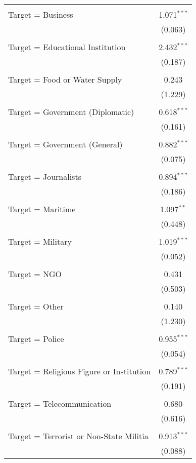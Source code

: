 \begin{table}[!htbp]
\begin{tabular}{@{\extracolsep{0.1pt}}lc}
  & \\ 
 Target = Business & 1.071$^{***}$ \\ 
  & (0.063) \\ 
  & \\ 
 Target = Educational Institution & 2.432$^{***}$ \\ 
  & (0.187) \\ 
  & \\ 
 Target = Food or Water Supply & 0.243 \\ 
  & (1.229) \\ 
  & \\ 
 Target = Government (Diplomatic) & 0.618$^{***}$ \\ 
  & (0.161) \\ 
  & \\ 
 Target =  Government (General) & 0.882$^{***}$ \\ 
  & (0.075) \\ 
  & \\ 
 Target = Journalists & 0.894$^{***}$ \\ 
  & (0.186) \\ 
  & \\ 
 Target = Maritime & 1.097$^{**}$ \\ 
  & (0.448) \\ 
  & \\ 
 Target = Military & 1.019$^{***}$ \\ 
  & (0.052) \\ 
  & \\ 
 Target = NGO & 0.431 \\ 
  & (0.503) \\ 
  & \\ 
 Target = Other & 0.140 \\ 
  & (1.230) \\ 
  & \\ 
 Target = Police & 0.955$^{***}$ \\ 
  & (0.054) \\ 
  & \\ 
 Target = Religious Figure or Institution & 0.789$^{***}$ \\ 
  & (0.191) \\ 
  & \\ 
 Target = Telecommunication & 0.680 \\ 
  & (0.616) \\ 
  & \\ 
 Target = Terrorist or Non-State Militia & 0.913$^{***}$ \\ 
  & (0.088) \\ 

\end{tabular}
\end{table}
